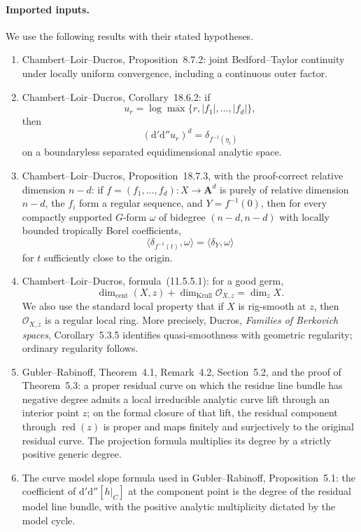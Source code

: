 
\paragraph{Imported inputs.}
We use the following results with their stated hypotheses.
\begin{enumerate}
\item Chambert--Loir--Ducros, Proposition~8.7.2: joint
Bedford--Taylor continuity under locally uniform convergence, including a
continuous outer factor.
\item Chambert--Loir--Ducros, Corollary~18.6.2: if
\[
 u_r=\log\max\{r,|f_1|,\ldots,|f_d|\},
\]
then
\[
 (\mathrm d'\mathrm d''u_r)^d=\delta_{f^{-1}(\eta_r)}
\]
on a boundaryless separated equidimensional analytic space.
\item Chambert--Loir--Ducros, Proposition~18.7.3, with the
proof-correct relative dimension $n-d$: if
$f=(f_1,\ldots,f_d):X\to\mathbf A^d$ is purely of relative dimension
$n-d$, the $f_i$ form a regular sequence, and $Y=f^{-1}(0)$, then for every
compactly supported $G$-form $\omega$ of bidegree $(n-d,n-d)$ with locally
bounded tropically Borel coefficients,
\[
 \langle\delta_{f^{-1}(t)},\omega\rangle
 =\langle\delta_Y,\omega\rangle
\]
for $t$ sufficiently close to the origin.
\item Chambert--Loir--Ducros, formula~(11.5.5.1): for a good germ,
\[
 \dim_{\mathrm{cent}}(X,z)+\dim_{\mathrm{Krull}}\mathcal O_{X,z}
 =\dim_zX.
\]
We also use the standard local property that if $X$ is rig-smooth at $z$,
then $\mathcal O_{X,z}$ is a regular local ring.  More precisely, Ducros,
\emph{Families of Berkovich spaces}, Corollary~5.3.5 identifies
quasi-smoothness with geometric regularity; ordinary regularity follows.
\item Gubler--Rabinoff, Theorem~4.1, Remark~4.2, Section~5.2, and the
proof of Theorem~5.3: a proper residual curve on which the residue line
bundle has negative degree admits a local irreducible analytic curve lift
through an interior point $z$; on the formal closure of that lift, the
residual component through $\operatorname{red}(z)$ is proper and maps
finitely and surjectively to the original residual curve.  The projection
formula multiplies its degree by a strictly positive generic degree.
\item The curve model slope formula used in Gubler--Rabinoff,
Proposition~5.1: the coefficient of
$\mathrm d'\mathrm d''[h|_C]$ at the component point is the degree of the
residual model line bundle, with the positive analytic multiplicity dictated
by the model cycle.
\end{enumerate}

